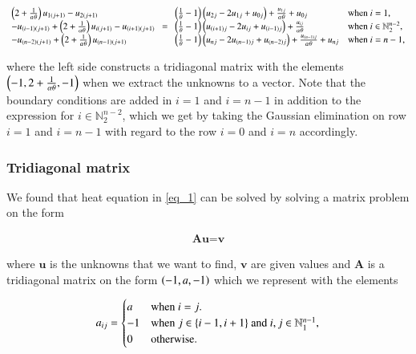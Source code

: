 \documentclass[11pt,english,a4paper]{article}
\begin{document}
\begin{flushleft}
\begin{align}
\begin{array}{l} \left({2+\frac{1}{\alpha \theta}}\right)u_{1(j+1)} - u_{2(j+1)} \\  -u_{(i-1)(j+1)} +\left({2+\frac{1}{\alpha \theta}}\right)u_{i(j+1)} - u_{(i+1)(j+1)} \\ -u_{(n-2)(j+1)} +\left({2+\frac{1}{\alpha \theta}}\right)u_{(n-1)(j+1)} \end{array} = \begin{array}{ll} \left({\frac{1}{\theta}-1}\right)\left({u_{2j} - 2u_{1j} + u_{0j}}\right) + \frac{u_{1j}}{\alpha\theta} + u_{0j} & \text{when $i=1$,} \\ \left({\frac{1}{\theta}-1}\right)\left({u_{(i+1)j} - 2u_{ij} + u_{(i-1)j}}\right) + \frac{u_{ij}}{\alpha\theta} & \text{when $i\in\mathbb{N}_2^{n-2}$,}\\ \left({\frac{1}{\theta}-1}\right)\left({u_{nj} - 2u_{(n-1)j} + u_{(n-2)j}}\right) + \frac{u_{(n-1)j}}{\alpha\theta} + u_{nj} & \text{when $i=n-1$,}\end{array}
\label{eq_18}
\end{align}

where the left side constructs a tridiagonal matrix with the elements $\left({-1,2+\frac{1}{\alpha\theta},-1}\right)$ when we extract the unknowns to a vector. Note that the boundary conditions are added in $i=1$ and $i=n-1$  in addition to the expression for $i\in\mathbb{N}_2^{n-2}$, which we get by taking the Gaussian elimination on row $i=1$ and $i=n-1$ with regard to the row $i=0$ and $i=n$ accordingly.

\subsubsection{Tridiagonal matrix}

We found that heat equation in \eqref{eq_1} can be solved by solving a matrix problem on the form

\begin{align*}
\textbf{A}\textbf{u} = \textbf{v}
\end{align*} 

where $\textbf{u}$ is the unknowns that we want to find, $\textbf{v}$ are given values and $\textbf{A}$ is a tridiagonal matrix on the form $\left({-1,a,-1}\right)$ which we represent with the elements

\begin{align*}
a_{ij} = \begin{cases} a & \text{when $i=j$.} \\ -1 &\text{when $j\in\left\lbrace{i-1,i+1}\right\rbrace$ and $i,j\in\mathbb{N}_1^{n-1}$,} \\ 0 & \text{otherwise.}\end{cases}
\end{align*}


\end{flushleft}
\end{document}
